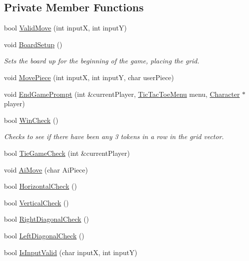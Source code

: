 \subsection*{Private Member Functions}
\begin{DoxyCompactItemize}
\item 
bool \hyperlink{classTicTacToe_ab3e52a3c1bb9fefe08f4c4641f8a70f8}{Valid\-Move} (int input\-X, int input\-Y)
\item 
void \hyperlink{classTicTacToe_a5a03afaffde20d826472e7a8e27995e4}{Board\-Setup} ()
\begin{DoxyCompactList}\small\item\em Sets the board up for the beginning of the game, placing the grid. \end{DoxyCompactList}\item 
void \hyperlink{classTicTacToe_afb236f340525d12a81667a340440b210}{Move\-Piece} (int input\-X, int input\-Y, char user\-Piece)
\item 
void \hyperlink{classTicTacToe_a608d3101cab7340fcc2d0ea5061c37ea}{End\-Game\-Prompt} (int \&current\-Player, \hyperlink{classTicTacToeMenu}{Tic\-Tac\-Toe\-Menu} menu, \hyperlink{classCharacter}{Character} $\ast$player)
\item 
bool \hyperlink{classTicTacToe_afe8f0ecd818f9f6b8418b7e597ff56a7}{Win\-Check} ()
\begin{DoxyCompactList}\small\item\em Checks to see if there have been any 3 tokens in a row in the grid vector. \end{DoxyCompactList}\item 
bool \hyperlink{classTicTacToe_a8134bdddf731a29f61f42273e23f1abf}{Tie\-Game\-Check} (int \&current\-Player)
\item 
void \hyperlink{classTicTacToe_a457647024a551cb3d574d47a9ca85091}{Ai\-Move} (char Ai\-Piece)
\item 
bool \hyperlink{classTicTacToe_afce358eabb849ae0dbf55818a7bdc56b}{Horizontal\-Check} ()
\item 
bool \hyperlink{classTicTacToe_aff214a5737d06961a5f6a14cf97ed1fe}{Vertical\-Check} ()
\item 
bool \hyperlink{classTicTacToe_a3b96d4252e042b2e85bb0bc9a501bc0c}{Right\-Diagonal\-Check} ()
\item 
bool \hyperlink{classTicTacToe_ad65a6d8382d7a59c68a6778caea91d78}{Left\-Diagonal\-Check} ()
\item 
bool \hyperlink{classTicTacToe_a6c8bc2be4b6fc3f462905252c70b5183}{Is\-Input\-Valid} (char input\-X, int input\-Y)

\end{DoxyCompactItemize}

